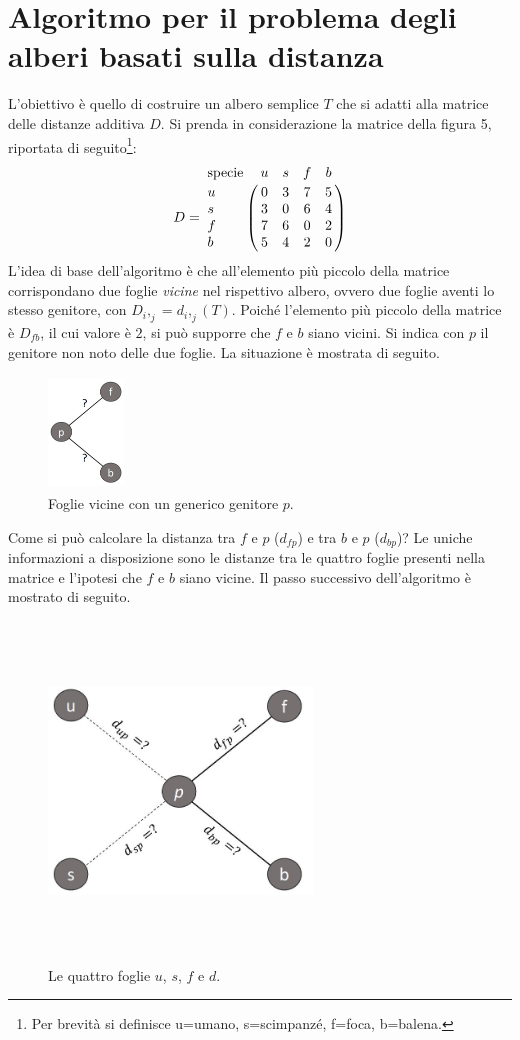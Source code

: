 \section{Algoritmo per il problema degli alberi basati sulla distanza}
L'obiettivo è quello di costruire un albero semplice $T$ che si adatti alla matrice delle distanze additiva $D$.
\newline
Si prenda in considerazione la matrice della figura 5, riportata di seguito\footnote{Per brevità si definisce u=umano, s=scimpanzé, f=foca, b=balena.}:
\[
D = \bordermatrix{\text{specie}&u&s&f&b\cr
                u& 0 & 3 & 7 & 5\cr
                s& 3 & 0 & 6 & 4\cr
                f& 7 & 6 & 0 & 2\cr
                b& 5 & 4 & 2 & 0}
\]
\newline
L'idea di base dell'algoritmo è che all'elemento più piccolo della matrice corrispondano due foglie \textit{vicine} nel rispettivo albero, ovvero due foglie aventi lo stesso genitore, con $D_i,_j=d_i,_j(T)$.
\newline
Poiché l'elemento più piccolo della matrice è $D_{fb}$, il cui valore è $2$, si può supporre che $f$ e $b$ siano vicini. Si indica con $p$ il genitore non noto delle due foglie. La situazione è mostrata di seguito.
\begin{figure}[h!]
\centering
	\includegraphics[height=3cm, width=2cm]{distance_between_f_b.jpg}
 	\caption{Foglie vicine con un generico genitore $p$.}
  	\label{fig:neighborsleaves}
\end{figure}
\newline
Come si può calcolare la distanza tra $f$ e $p$ ($d_{fp}$) e tra $b$ e $p$ ($d_{bp}$)? Le uniche informazioni a disposizione sono le distanze tra le quattro foglie presenti nella matrice e l'ipotesi che $f$ e $b$ siano vicine. Il passo successivo dell'algoritmo è mostrato di seguito.
\begin{figure}[h!]
\centering
	\includegraphics[height=9cm, width=7cm, keepaspectratio]{distance_between_f_b_part_2.jpg}
 	\caption{Le quattro foglie $u$, $s$, $f$ e $d$.}
  	\label{fig:neighborsleaves_2}
\end{figure}
